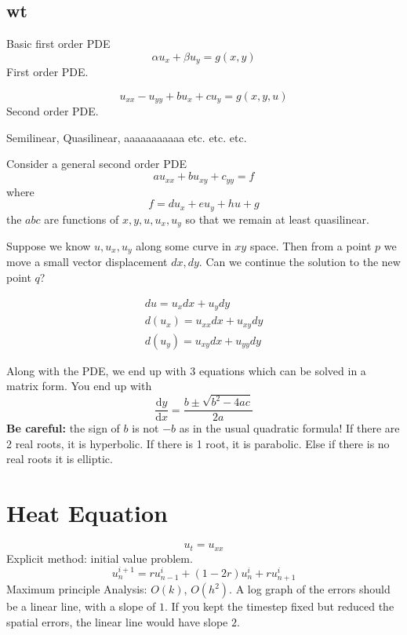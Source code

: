 \documentclass{article}
\numberwithin{equation}{section}
\theoremstyle{definition}
\newcommand{\dd}[2]{\frac{\mathrm{d} #1}{\mathrm{d} #2}}
\begin{document}
\subsection{wt}
Basic first order PDE
\begin{equation}
    \alpha u_x + \beta u_y = g(x,y)
\end{equation}
First order PDE.

\begin{equation}
    u_{xx}-u_{yy}+bu_x+cu_y = g(x,y,u)
\end{equation}
Second order PDE.

Semilinear, Quasilinear, aaaaaaaaaaa
etc. etc. etc.

Consider a general second order PDE
\begin{equation}
    au_{xx} + bu_{xy}+c_{yy} = f
\end{equation}
where
\begin{equation}
    f = du_x+eu_y+hu+g
\end{equation}
the $abc$ are functions of $x,y,u,u_x,u_y$ so that we remain at least quasilinear.

Suppose we know $u,u_x,u_y$ along some curve in $xy$ space. Then from a point $p$ we move a small vector displacement $dx,dy$. Can we continue the solution to the new point $q$?

\begin{align}
    du = u_x dx + u_y dy \\
    d(u_x) = u_{xx} dx + u_{xy} dy \\
    d(u_y) = u_{xy} dx + u_{yy} dy
\end{align}

Along with the PDE, we end up with 3 equations which can be solved in a matrix form. You end up with
\begin{equation}
    \dd{y}{x} = \frac{b \pm \sqrt{b^2-4ac}}{2a}
\end{equation}
\textbf{Be careful:} the sign of $b$ is not $-b$ as in the usual quadratic formula!
If there are 2 real roots, it is hyperbolic. If there is 1 root, it is parabolic. Else if there is no real roots it is elliptic.



\section{Heat Equation}
\begin{equation}
    u_t = u_{xx}
\end{equation}
Explicit method: initial value problem.
\begin{equation}
    u_{n}^{i+1} = ru_{n-1}^i + (1-2r) u_{n}^i + ru_{n+1}^i
\end{equation}
Maximum principle Analysis: $O(k)$, $O(h^2)$. A log graph of the errors should be a linear line, with a slope of $1$. If you kept the timestep fixed but reduced the spatial errors, the linear line would have slope $2$.
\end{document}
